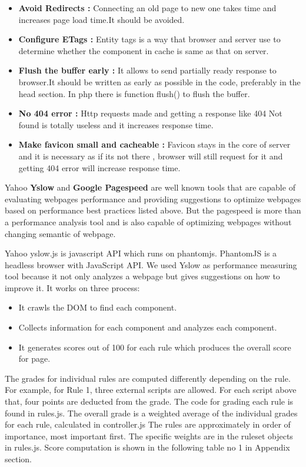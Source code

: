 \documentclass[a4paper,10pt]{IEEEtran}
\begin{document}
\begin{itemize}
\item \textbf{Avoid Redirects :}
Connecting an old page to new one takes time  and increases page load time.It
should be avoided.

\item \textbf{Configure ETags :}
Entity tags is a way that browser and server use to determine whether the
component in cache is same as that on server.

\item \textbf{Flush the buffer early :}
It allows to send partially ready response to browser.It should be written as
early as possible in the code, preferably in the head section.
In php there is function flush() to flush the buffer. 

\item \textbf{No 404 error :}
Http requests made and getting a response like 404 Not found is totally useless
and it increases response time.

\item \textbf{Make favicon small and cacheable :}
Favicon stays in the core of server and  it is necessary as if its not there ,
browser will still request for it and getting 404 error will increase response
time.
\end{itemize}

Yahoo {\bf Yslow} and {\bf Google Pagespeed} are well known tools that are capable of
evaluating webpages performance and providing suggestions to optimize webpages
based on performance best practices listed above. But the pagespeed is more than a performance analysis
tool and is also capable of optimizing webpages without changing semantic of webpage.

Yahoo yslow.js is javascript API which runs on phantomjs. PhantomJS is a
headless browser with JavaScript API. We used Yslow as performance measuring
tool because it not only analyzes a webpage but gives suggestions on how to
improve it.
It works on three process:
\begin{itemize}
\item It crawls the DOM to find each component.
\item Collects information for each component and analyzes each component.
\item It generates scores out of 100 for each rule which produces the overall
score for page.
\end{itemize}
The grades for individual rules are computed differently depending on the rule.
For example, for Rule 1, three external scripts are allowed. For each script
above that, four points are deducted from the grade. The code for grading each
rule is found in rules.js. The overall grade is a weighted average of the
individual grades for each rule, calculated in controller.js The rules are
approximately in order of importance, most important first. The specific weights
are in the ruleset objects in rules.js. Score computation is shown in
the following table no 1 in Appendix section.
\end{document}
